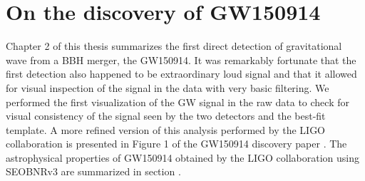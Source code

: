 \section{On the discovery of GW150914}
Chapter 2 of this thesis summarizes the first direct detection of gravitational wave from a BBH merger, the GW150914.  It was remarkably fortunate that the first detection also happened to be extraordinary loud signal and that it allowed for visual inspection of the signal in the data with very basic filtering. We performed the first visualization of the GW signal in the raw data to check for visual consistency of the signal seen by the two detectors and the best-fit template. A more refined version of this analysis performed by the LIGO collaboration is presented in Figure 1 of the GW150914 discovery paper \cite{gw150914detection}. The astrophysical properties of GW150914 obtained by the LIGO collaboration using SEOBNRv3 are summarized in section \cite{PEonGW150915}.   





